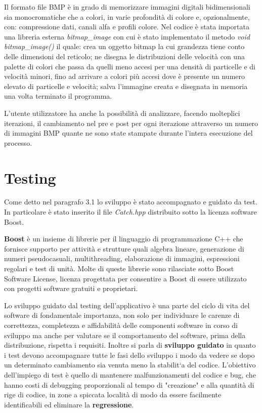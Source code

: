 {Il formato file BMP \`e in grado di memorizzare immagini digitali bidimensionali sia monocromatiche che a colori, in varie profondit\`a di colore e, opzionalmente, con: compressione dati, canali alfa e profili colore. Nel codice \`e stata importata una libreria esterna \textit{bitmap\_image} con cui \`e stato implementato il metodo \textit{void bitmap\_image()} il quale: crea un oggetto bitmap la cui grandezza tiene conto delle dimensioni del reticolo; ne disegna le distribuzioni delle velocit\`a con una palette di colori che passa da quelli meno accesi per una densit\`a di particelle e di velocit\`a minori, fino ad arrivare a colori pi\`u accesi dove \`e presente un numero elevato di particelle e velocit\`a; salva l'immagine creata e disegnata in memoria una volta terminato il programma. 

L'utente utilizzatore ha anche la possibilit\`a di analizzare, facendo molteplici iterazioni, il cambiamento nel pre e post per ogni iterazione attraverso un numero di immagini BMP quante ne sono state stampate durante l'intera esecuzione del processo.

\section{Testing}
Come detto nel paragrafo 3.1 lo sviluppo \`e stato accompagnato e guidato da test. In particolare \`e stato inserito il file \textit{Catch.hpp} distribuito sotto la licenza software Boost.

\textbf{Boost} \`e un insieme di librerie per il linguaggio di programmazione C++ che fornisce supporto per attivit\`a e strutture quali algebra lineare, generazione di numeri pseudocasuali, multithreading, elaborazione di immagini, espressioni regolari e test di unit\`a. Molte di queste librerie sono rilasciate sotto Boost Software License, licenza progettata per consentire a Boost di essere utilizzato con progetti software gratuiti e proprietari.

Lo sviluppo guidato dal testing dell'applicativo \`e una parte del ciclo di vita del software di fondamentale importanza, non solo per individuare le carenze di correttezza, completezza e affidabilit\`a delle componenti software in corso di sviluppo ma anche per valutare se il comportamento del software, prima della distribuzione, rispetta i requisiti. Inoltre si parla di \textbf{sviluppo guidato} in quanto i test devono accompagnare tutte le fasi dello sviluppo i modo da vedere se dopo un determinato cambiamento sia venuta meno la stabilit`a del codice. L'obiettivo dell'impiego di test \`e quello di mantenere malfunzionamenti del codice e bug, che hanno costi di debugging proporzionali al tempo di "creazione" e alla quantit\`a di rige di codice, in zone a spiccata localit\`a di modo da essere facilmente identificabili ed eliminare la \textbf{regressione}.
}